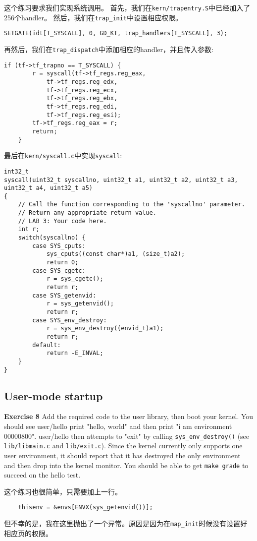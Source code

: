 \documentclass[11pt]{article}
\begin{document}
这个练习要求我们实现系统调用。
首先，我们在\lstinline|kern/trapentry.S|中已经加入了256个handler。
然后，我们在\lstinline|trap_init|中设置相应权限。
\begin{lstlisting}[title=kern/trap.c]
	SETGATE(idt[T_SYSCALL], 0, GD_KT, trap_handlers[T_SYSCALL], 3);
\end{lstlisting}
再然后，我们在\lstinline|trap_dispatch|中添加相应的handler，并且传入参数:
\begin{lstlisting}[title=kern/trap.c]
	if (tf->tf_trapno == T_SYSCALL) {
		r = syscall(tf->tf_regs.reg_eax,
			tf->tf_regs.reg_edx,
			tf->tf_regs.reg_ecx,
			tf->tf_regs.reg_ebx,
			tf->tf_regs.reg_edi,
			tf->tf_regs.reg_esi);
		tf->tf_regs.reg_eax = r;
		return;
	}
\end{lstlisting}
最后在\lstinline|kern/syscall.c|中实现\lstinline|syscall|:
\begin{lstlisting}[title=kern/syscall.c]
int32_t
syscall(uint32_t syscallno, uint32_t a1, uint32_t a2, uint32_t a3, uint32_t a4, uint32_t a5)
{
	// Call the function corresponding to the 'syscallno' parameter.
	// Return any appropriate return value.
	// LAB 3: Your code here.
	int r;
	switch(syscallno) {
		case SYS_cputs:
			sys_cputs((const char*)a1, (size_t)a2);
			return 0;
		case SYS_cgetc:
			r = sys_cgetc();
			return r;
		case SYS_getenvid:
			r = sys_getenvid();
			return r;
		case SYS_env_destroy:
			r = sys_env_destroy((envid_t)a1);
			return r;
		default:
			return -E_INVAL;
	}
}
\end{lstlisting}
\subsection{User-mode startup}
\begin{framed}
\noindent\textbf{Exercise 8} Add the required code to the user library, then boot your kernel. You should see user/hello print "hello, world" and then print "i am environment 00000800". user/hello then attempts to "exit" by calling \lstinline|sys_env_destroy()| (see \lstinline|lib/libmain.c| and \lstinline|lib/exit.c|). Since the kernel currently only supports one user environment, it should report that it has destroyed the only environment and then drop into the kernel monitor. You should be able to get \lstinline|make grade| to succeed on the hello test. 
\end{framed}

这个练习也很简单，只需要加上一行。
\begin{lstlisting}
	thisenv = &envs[ENVX(sys_getenvid())];
\end{lstlisting}
但不幸的是，我在这里抛出了一个异常。原因是因为在\lstinline|map_init|时候没有设置好相应页的权限。
\end{document}
